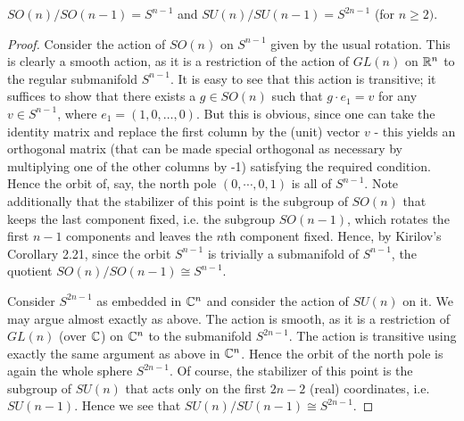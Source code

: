 \documentclass{../../mathnotes}
\begin{document}
\begin{prop}
    $SO(n)/SO(n-1)=S^{n-1}$ and $SU(n)/SU(n-1)=S^{2n-1}$ (for $n\geq 2)$.
\end{prop}
\begin{proof}
    Consider the action of $SO(n)$ on $S^{n-1}$ given by the usual rotation. This is clearly a smooth action, as it is a restriction
    of the action of $GL(n)$ on $\mathbb{R}^n$ to the regular submanifold $S^{n-1}$. 
    It is easy to see that this action is transitive; it suffices to show that there exists a $g\in SO(n)$ such that $g\cdot e_1=v$
    for any $v\in S^{n-1}$, where $e_1=(1,0,\ldots,0)$. But this is obvious, since one can take the identity matrix and replace the first column
    by the (unit) vector $v$ - this yields an orthogonal matrix (that can be made special orthogonal as necessary by multiplying one of the
    other columns by -1) satisfying the required condition. Hence the orbit of, say, the north pole $(0,\cdots,0,1)$ is all of $S^{n-1}$.
    Note additionally that the stabilizer of
    this point is the subgroup of $SO(n)$ that keeps the last component fixed, i.e. the subgroup $SO(n-1)$, which rotates the first $n-1$ components
    and leaves the $n$th component fixed. Hence, by Kirilov's Corollary 2.21, since the orbit $S^{n-1}$ is trivially a submanifold of $S^{n-1}$,
    the quotient $SO(n)/SO(n-1)\cong S^{n-1}$.

    Consider $S^{2n-1}$ as embedded in $\mathbb{C}^n$ and consider the action of $SU(n)$ on it. We may argue almost exactly as above. The action is smooth,
    as it is a restriction of $GL(n)$ (over $\mathbb{C}$) on $\mathbb{C}^n$ to the submanifold $S^{2n-1}$. The action is transitive using exactly the same
    argument as above in $\mathbb{C}^n$. Hence the orbit of the north pole is again the whole sphere $S^{2n-1}$. Of course, the stabilizer of this point
    is the subgroup of $SU(n)$ that acts only on the first $2n-2$ (real) coordinates, i.e. $SU(n-1)$. Hence we see that $SU(n)/SU(n-1)\cong S^{2n-1}$.
\end{proof}
\end{document}
